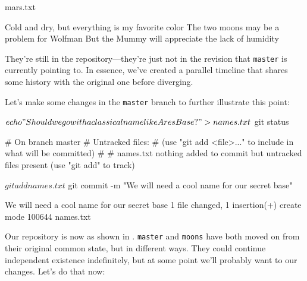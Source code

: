 \documentclass{book}
\begin{document}
\begin{VerbOut}
mars.txt
\end{VerbOut}


\begin{VerbOut}
Cold and dry, but everything is my favorite color
The two moons may be a problem for Wolfman
But the Mummy will appreciate the lack of humidity
\end{VerbOut}

They're still in the repository---they're just not in the revision that
\texttt{master} is currently pointing to. In essence, we've created a
parallel timeline that shares some history with the original one before
diverging.

Let's make some changes in the \texttt{master} branch to further
illustrate this point:

\begin{VerbIn}
$ echo "Should we go with a classical name like Ares Base?" > names.txt
$ git status
\end{VerbIn}

\begin{VerbOut}
# On branch master
# Untracked files:
#   (use "git add <file>..." to include in what will be committed)
#
#    names.txt
nothing added to commit but untracked files present (use "git add" to track)
\end{VerbOut}

\begin{VerbIn}
$ git add names.txt
$ git commit -m "We will need a cool name for our secret base"
\end{VerbIn}

\begin{VerbOut}
 We will need a cool name for our secret base
 1 file changed, 1 insertion(+)
 create mode 100644 names.txt
\end{VerbOut}


Our repository is now as shown in .
\texttt{master} and \texttt{moons} have both moved on from their
original common state, but in different ways. They could continue
independent existence indefinitely, but at some point we'll probably
want to  our changes. Let's do that now:
\end{document}
